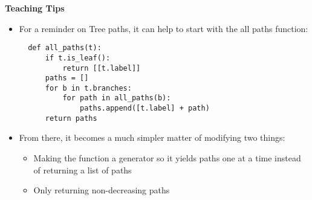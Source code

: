 \begin{blocksection}
\begin{guide}
\textbf{Teaching Tips}
\begin{itemize}
  \item For a reminder on Tree paths, it can help to start with the all paths function:
  \begin{lstlisting}
  def all_paths(t):
      if t.is_leaf():
          return [[t.label]]
      paths = []
      for b in t.branches:
          for path in all_paths(b):
              paths.append([t.label] + path)
      return paths
  \end{lstlisting}
  \item From there, it becomes a much simpler matter of modifying two things:
  \begin{itemize}
    \item Making the function a generator so it yields paths one at a time instead of returning a list of paths
    \item Only returning non-decreasing paths
  \end{itemize}
\end{itemize}
\end{guide}
\end{blocksection}
